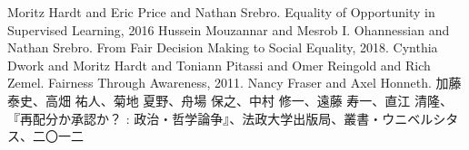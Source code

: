 \documentclass[b5j,twoside,twocolumn]{utarticle}
\begin{document}
\begin{thebibliography}{99}
  Moritz Hardt and Eric Price and Nathan Srebro. Equality of Opportunity in Supervised Learning, 2016
  Hussein Mouzannar and Mesrob I. Ohannessian and Nathan Srebro. From Fair Decision Making to Social Equality, 2018.
  Cynthia Dwork and Moritz Hardt and Toniann Pitassi and Omer Reingold and Rich Zemel. Fairness Through Awareness, 2011.
  Nancy Fraser and Axel Honneth. 加藤 泰史、高畑 祐人、菊地 夏野、舟場 保之、中村 修一、遠藤 寿一、直江 清隆、『再配分か承認か？ : 政治・哲学論争』、法政大学出版局、叢書・ウニベルシタス、二〇一二
  
\end{thebibliography}





%
\end{document}
